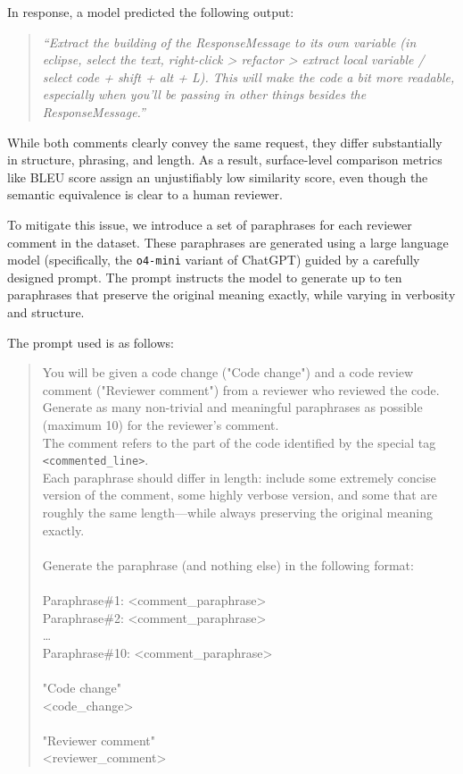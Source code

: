 In response, a model predicted the following output:

\begin{quote}
	\textit{“Extract the building of the ResponseMessage to its own variable (in eclipse, select the
		text, right-click > refactor > extract local variable / select code + shift + alt + L). This
		will make the code a bit more readable, especially when you’ll be passing in other things besides
		the ResponseMessage.”}
\end{quote}

While both comments clearly convey the same request, they differ substantially in structure,
phrasing, and length. As a result, surface-level comparison metrics like BLEU score assign an
unjustifiably low similarity score, even though the semantic equivalence is clear to a human
reviewer.

To mitigate this issue, we introduce a set of paraphrases for each reviewer comment in the dataset.
These paraphrases are generated using a large language model (specifically, the \texttt{o4-mini}
variant of ChatGPT) guided by a carefully designed prompt. The prompt instructs the model to
generate up to ten paraphrases that preserve the original meaning exactly, while varying in
verbosity and structure.

The prompt used is as follows:

\begin{quote}\ttfamily
	You will be given a code change ("Code change") and a code review comment ("Reviewer comment")
	from a reviewer who reviewed the code.\\
	Generate as many non-trivial and meaningful paraphrases as possible (maximum 10) for the
	reviewer's comment.\\
	The comment refers to the part of the code identified by the special tag
	\texttt{<commented\_line>}.\\
	Each paraphrase should differ in length: include some extremely concise version of the comment,
	some highly verbose version, and some that are roughly the same length—while always preserving
	the original meaning exactly.\\
	\\
	Generate the paraphrase (and nothing else) in the following format:\\
	\\
	Paraphrase\#1: \textless comment\_paraphrase\textgreater\\
	Paraphrase\#2: \textless comment\_paraphrase\textgreater\\
	\ldots\\
	Paraphrase\#10: \textless comment\_paraphrase\textgreater\\
	\\
	"Code change"\\
	\textless code\_change\textgreater\\
	\\
	"Reviewer comment"\\
	\textless reviewer\_comment\textgreater
\end{quote}


